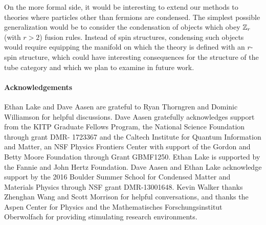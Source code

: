 
On the more formal side, it would be interesting to extend our methods to theories where particles other than fermions are condensed. 
The simplest possible generalization would be to consider the condensation of objects which obey $\mathbb{Z}_r$ (with $r>2$) 
fusion rules. 
Instead of spin structures, condensing such objects would require equipping the manifold on which the theory is defined with an $r$-spin structure, 
which could have interesting consequences for the structure of the 
tube category and which we plan to examine in future work. 


 \paragraph{Acknowledgements}
 
Ethan Lake and Dave Aasen are grateful to Ryan Thorngren and Dominic Williamson for helpful discussions. Dave Aasen gratefully acknowledges support from the KITP Graduate Fellows Program, the National Science Foundation through grant DMR- 1723367
and the Caltech Institute for Quantum Information and Matter, 
an NSF Physics Frontiers Center with support of the Gordon and Betty Moore Foundation through Grant GBMF1250.
Ethan Lake is supported by the Fannie and John Hertz Foundation.
Dave Aasen and Ethan Lake acknowledge support by the 2016 Boulder Summer School for Condensed
Matter and Materials Physics through NSF grant DMR-13001648.
Kevin Walker thanks Zhenghan Wang and Scott Morrison for helpful conversations, and
thanks the Aspen Center for Physics and  the Mathematisches Forschungsinstitut Oberwolfach
for providing stimulating research environments.

